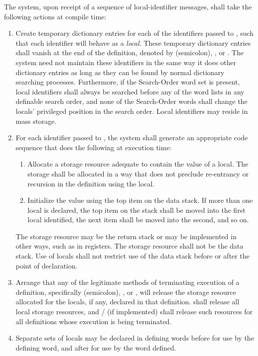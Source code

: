 The system, upon receipt of a sequence of local-identifier messages,
shall take the following actions at compile time:
\begin{enumerate}
\item Create temporary dictionary entries for each of the
	identifiers passed to , such that each identifier
	will behave as a \emph{local}. These temporary dictionary
	entries shall vanish at the end of the definition, denoted by
	\word[core]{;} (semicolon), , or
	. The system need not maintain these
	identifiers in the same way it does other dictionary entries
	as long as they can be found by normal dictionary searching
	processes. Furthermore, if the Search-Order word set is present,
	local identifiers shall always be searched before any of the
	word lists in any definable search order, and none of the
	Search-Order words shall change the locals' privileged position
	in the search order. Local identifiers may reside in mass storage.

\item For each identifier passed to , the system shall
	generate an appropriate code sequence that does the following at
	execution time:

	\begin{enumerate}
	\item Allocate a storage resource adequate to contain the value
		of a local. The storage shall be allocated in a way that
		does not preclude re-entrancy or recursion in the definition
		using the local.

	\item Initialize the value using the top item on the data stack.
		If more than one local is declared, the top item on the
		stack shall be moved into the first local identified, the
		next item shall be moved into the second, and so on.
	\end{enumerate}

	The storage resource may be the return stack or may be
	implemented in other ways, such as in registers. The storage
	resource shall not be the data stack. Use of locals shall not
	restrict use of the data stack before or after the point of
	declaration.

\item Arrange that any of the legitimate methods of terminating
	execution of a definition, specifically \word[core]{;}
	(semicolon), ,  or
	, will release the storage resource allocated
	for the locals, if any, declared in that definition.
	 shall release all local storage resources,
	and  /  (if
	implemented) shall release such resources for all definitions
	whose execution is being terminated.

\item Separate sets of locals may be declared in defining words
	before  for use by the defining word, and
	after  for use by the word defined.
\end{enumerate}

